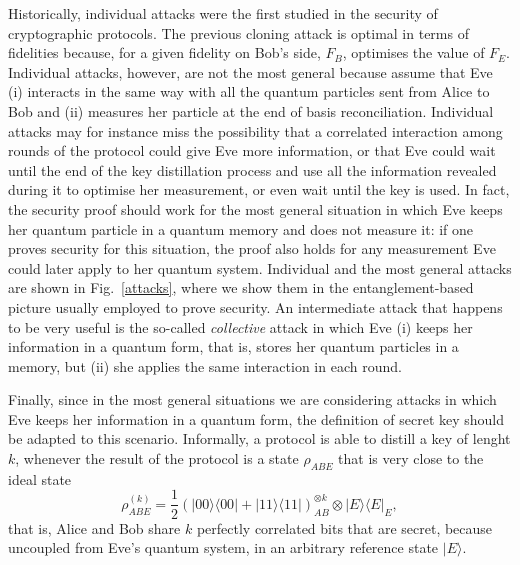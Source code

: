 \documentclass[a4paper]{article}
\def\bra#1{\langle#1|} \def\ket#1{|#1\rangle}
\def\proj#1{\ket{#1}\!\bra{#1}}
\begin{document}
Historically, individual attacks were the first studied in the security of cryptographic protocols. The previous cloning attack is optimal in terms of fidelities because, for a given fidelity on Bob's side, $F_B$, optimises the value of $F_E$. Individual attacks, however, are not the most general because assume that Eve (i) interacts in the same way with all the quantum particles sent from Alice to Bob and (ii) measures her particle at the end of basis reconciliation. Individual attacks may for instance miss the possibility that a correlated interaction among rounds of the protocol could give Eve more information, or that Eve could wait until the end of the key distillation process and use all the information revealed during it to optimise her measurement, or even wait until the key is used. In fact, the security proof should work for the most general situation in which Eve keeps her quantum particle in a quantum memory and does not measure it: if one proves security for this situation, the proof also holds for any measurement Eve could later apply to her quantum system. Individual and the most general attacks are shown in Fig.~\ref{attacks}, where we show them in the entanglement-based picture usually employed to prove security. An intermediate attack that happens to be very useful is the so-called \emph{collective} attack in which Eve (i) keeps her information in a quantum form, that is, stores her quantum particles in a memory, but (ii) she applies the same interaction in each round. 

Finally, since in the most general situations we are considering attacks in which Eve keeps her information in a quantum form, the definition of secret key should be adapted to this scenario. Informally, a protocol is able to distill a key of lenght $k$, whenever the result of the protocol is a state $\rho_{ABE}$ that is very close to the ideal state
\begin{equation}
\label{secretkey}
\rho_{ABE}^{(k)}=\frac{1}{2}(\proj{00}+\proj{11})_{AB}^{\otimes k}\otimes\proj{E}_E ,
\end{equation}
that is, Alice and Bob share $k$ perfectly correlated bits that are secret, because uncoupled from Eve's quantum system, in an arbitrary reference state $\ket E$.
\end{document}
